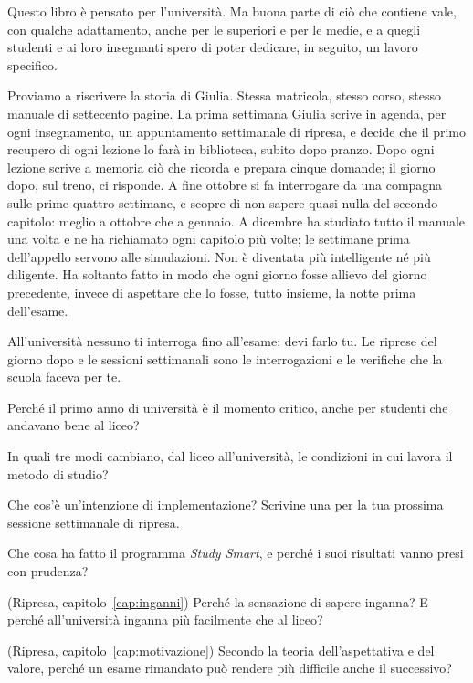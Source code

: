 Questo libro è pensato per l'università. Ma buona parte di ciò che
contiene vale, con qualche adattamento, anche per le superiori e per
le medie, e a quegli studenti e ai loro insegnanti spero di poter
dedicare, in seguito, un lavoro specifico.

\asterismo

Proviamo a riscrivere la storia di Giulia. Stessa matricola, stesso
corso, stesso manuale di settecento pagine. La prima settimana
Giulia scrive in agenda, per ogni insegnamento, un appuntamento
settimanale di ripresa, e decide che il primo recupero di ogni lezione
lo farà in biblioteca, subito dopo pranzo. Dopo ogni lezione scrive a
memoria ciò che ricorda e prepara cinque domande; il giorno dopo, sul
treno, ci risponde. A fine ottobre si fa interrogare da una compagna
sulle prime quattro settimane, e scopre di non sapere quasi nulla del
secondo capitolo: meglio a ottobre che a gennaio. A dicembre ha
studiato tutto il manuale una volta e ne ha richiamato ogni capitolo
più volte; le settimane prima dell'appello servono alle simulazioni.
Non è diventata più intelligente né più diligente. Ha soltanto fatto
in modo che ogni giorno fosse allievo del giorno precedente, invece di
aspettare che lo fosse, tutto insieme, la notte prima dell'esame.

\begin{daricordare}
All'università nessuno ti interroga fino all'esame: devi farlo tu. Le
riprese del giorno dopo e le sessioni settimanali sono le
interrogazioni e le verifiche che la scuola faceva per te.
\end{daricordare}

\begin{domande}
  \item Perché il primo anno di università è il momento critico, anche
        per studenti che andavano bene al liceo?
  \item In quali tre modi cambiano, dal liceo all'università, le
        condizioni in cui lavora il metodo di studio?
  \item Che cos'è un'intenzione di implementazione? Scrivine una per la
        tua prossima sessione settimanale di ripresa.
  \item Che cosa ha fatto il programma \emph{Study Smart}, e perché i
        suoi risultati vanno presi con prudenza?
  \item (Ripresa, capitolo~\ref{cap:inganni}) Perché la sensazione di
        sapere inganna? E perché all'università inganna più facilmente
        che al liceo?
  \item (Ripresa, capitolo~\ref{cap:motivazione}) Secondo la teoria
        dell'aspettativa e del valore, perché un esame rimandato può
        rendere più difficile anche il successivo?
\end{domande}

